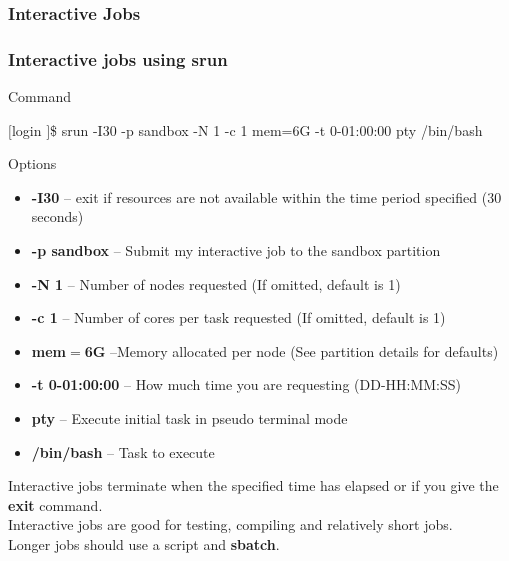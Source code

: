 \subsubsection{Interactive Jobs}
\begin{frame}
  \frametitle{Interactive jobs using srun}

  \begin{block}{Command}\small
		\begin{semiverbatim}$[$login \ctilde$]$\$ srun -I30 -p sandbox -N 1 -c 1 \ddash{}mem=6G -t 0-01:00:00 \ddash{}pty /bin/bash\end{semiverbatim}	
  \end{block}
  \begin{block}{Options}\small
	\begin{itemize}
	\item \textbf{-I30} -- exit if resources are not available within the time period specified (30 seconds)
	\item \textbf{-p sandbox} -- Submit my interactive job to the sandbox partition
	\item \textbf{-N 1} -- Number of nodes requested (If omitted, default is 1)
	\item \textbf{-c 1} -- Number of cores per task requested (If omitted, default is 1)
	\item \textbf{\ddash{}mem$=$6G} --Memory allocated per node (See partition details for defaults)
	\item \textbf{-t 0-01:00:00} -- How much time you are requesting (DD-HH:MM:SS)
	\item \textbf{\ddash{}pty} -- Execute initial task in pseudo terminal mode
	\item \textbf{/bin/bash} -- Task to execute
	\end{itemize}
	\end{block}
  \btVFill
  \begin{center}\small Interactive jobs terminate when the specified time has elapsed or if you give the \textbf{exit} command.\\Interactive jobs are good for testing, compiling and relatively short jobs.\\Longer jobs should use a script and \textbf{sbatch}.\\ \end{center}
  \end{frame}


